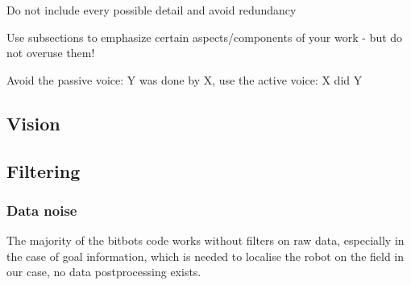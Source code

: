 \documentclass[lnicst,a4paper]{svmultln}
\begin{document}
Do not include every possible detail and avoid redundancy

Use subsections to emphasize certain aspects/components of
your work -
but do not overuse them!

Avoid the passive voice: Y was done by X, use the active voice: X did Y





\subsection{Vision}





\subsection{Filtering}

\subsubsection{Data noise}
The majority of the bitbots code works without filters on raw data, especially in the case of goal information, which is needed to localise the robot on the field in our case, no data postprocessing exists.
\end{document}
